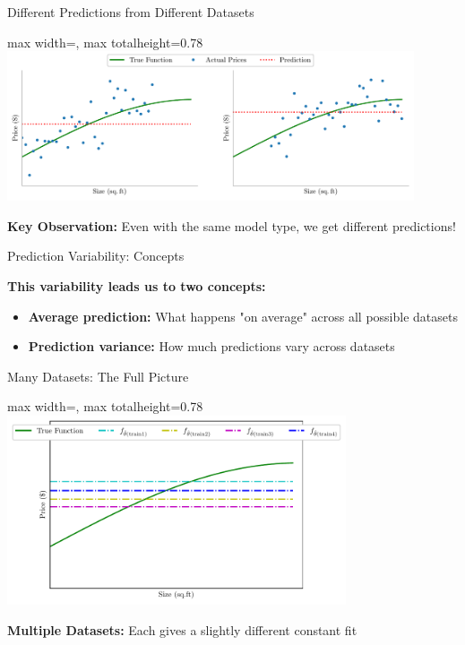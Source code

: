 \documentclass[10pt]{beamer}
\newcommand{\fitpic}[1]{\begin{adjustbox}{max width=\linewidth, max totalheight=0.78\textheight}#1\end{adjustbox}}
\begin{document}
\begin{frame}{Different Predictions from Different Datasets}
\footnotesize
\begin{center}
\fitpic{\includegraphics[width=0.9\textwidth]{../assets/bias-variance/figures/bias3_latexify.pdf}}
\end{center}

\begin{alertbox}
\raggedright
\textbf{Key Observation:} Even with the same model type, we get different predictions!
\end{alertbox}
\end{frame}

\begin{frame}{Prediction Variability: Concepts}
\footnotesize
\begin{definitionbox}
\raggedright
\textbf{This variability leads us to two concepts:}
\begin{itemize}
\item \textbf{Average prediction:} What happens "on average" across all possible datasets
\item \textbf{Prediction variance:} How much predictions vary across datasets
\end{itemize}
\end{definitionbox}
\end{frame}

\begin{frame}{Many Datasets: The Full Picture}
\footnotesize
\begin{center}
\fitpic{\includegraphics[width=0.75\textwidth]{../assets/bias-variance/figures/bias4_latexify.pdf}}
\end{center}

\begin{keypointsbox}
\raggedright
\textbf{Multiple Datasets:} Each gives a slightly different constant fit
\end{keypointsbox}
\end{frame}
\end{document}
